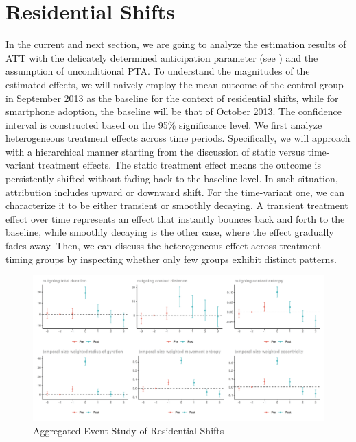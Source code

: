 \section{Residential Shifts}\label{main_res_residential_shift}
In the current and next section, we are going to analyze the estimation results of ATT with the delicately determined anticipation parameter (see ) and the assumption of unconditional PTA.
To understand the magnitudes of the estimated effects, we will naively employ the mean outcome of the control group in September 2013 as the baseline for the context of residential shifts, while for smartphone adoption, the baseline will be that of October 2013.
The confidence interval is constructed based on the 95\% significance level. We first analyze heterogeneous treatment effects across time periods.
Specifically, we will approach with a hierarchical manner starting from the discussion of static versus time-variant treatment effects.
The static treatment effect means the outcome is persistently shifted without fading back to the baseline level.
In such situation, attribution includes upward or downward shift.
For the time-variant one, we can characterize it to be either transient or smoothly decaying.
A transient treatment effect over time represents an effect that instantly bounces back and forth to the baseline, while smoothly decaying is the other case, where the effect gradually fades away.
Then, we can discuss the heterogeneous effect across treatment-timing groups by inspecting whether only few groups exhibit distinct patterns.


\begin{figure}[h!]
\centering
\caption{Aggregated Event Study of Residential Shifts}
\vspace{0.1cm}

\includegraphics[scale=0.49]{figures/csdid/residential_shift.png}

\label{fig:event_study_residential_shift}
\end{figure}


